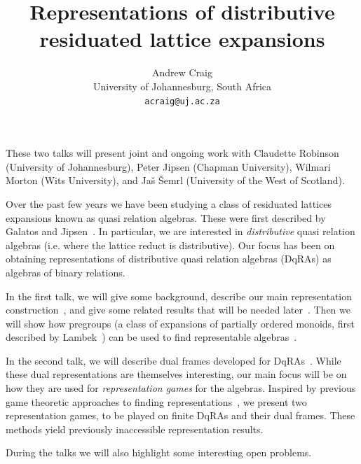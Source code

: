 \documentclass[a4paper]{article} %
\date{} %
\begin{document}
\setcounter{page}{1} %

\title{Representations of distributive residuated lattice expansions}

\author{Andrew Craig  \\ %
       University of Johannesburg, South Africa\\ \texttt{acraig@uj.ac.za} %
       }%

\maketitle


These two talks will present joint and ongoing work with Claudette Robinson (University of Johannesburg), Peter Jipsen (Chapman University), Wilmari Morton (Wits University), and Ja\v{s} \v{S}emrl (University of the West of Scotland). 

Over the past few years we have been studying a class of residuated lattices expansions known as quasi relation algebras. These were first described by Galatos and Jipsen~\cite{GJ13}. In particular, we are interested in \emph{distributive} quasi relation algebras (i.e. where the lattice reduct is distributive). Our focus has been on obtaining  representations of distributive quasi relation algebras (DqRAs) as algebras of binary relations. 

In the first talk, we will give some background, describe our main representation construction~\cite{CR25}, and give some related results that will be needed later~\cite{CMR26}. Then we will show how  pregroups (a class of expansions of partially ordered monoids, first described by Lambek~\cite{Lambek99}) can be used to find representable algebras~\cite{CR26}.  

In the second talk, we will describe dual frames developed for DqRAs~\cite{CJR24,CJR26}. While these dual representations are themselves interesting, our main focus will be on how they are used for \emph{representation games} for the algebras. Inspired by previous game theoretic approaches to finding representations~\cite{HH02,JS23}, we present two representation games, to be played on finite DqRAs and their dual frames. These methods yield previously inaccessible representation results.  

During the talks we will also highlight some interesting open problems. 
\end{document}

